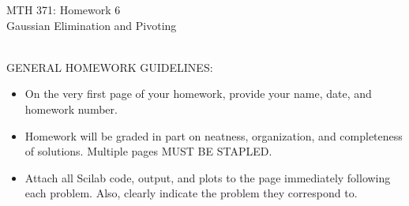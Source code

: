 \documentclass[addpoints, 11pt]{exam}
\begin{document}
\vspace{100mm}
\begin{center} \Large
MTH 371: Homework 6 \\ Gaussian Elimination and Pivoting \normalsize
\end{center}
\ \\
\noindent GENERAL HOMEWORK GUIDELINES: 
\begin{itemize}
\item On the very first page of your homework, provide your name, date, and homework number.\vspace{-2mm}
\item Homework will be graded in part on neatness, organization, and completeness of solutions. Multiple pages MUST BE STAPLED. \vspace{-2mm}
\item Attach all Scilab code, output, and plots to the page immediately following each problem. Also, clearly indicate the problem they correspond to.
\end{itemize}
\end{document}
